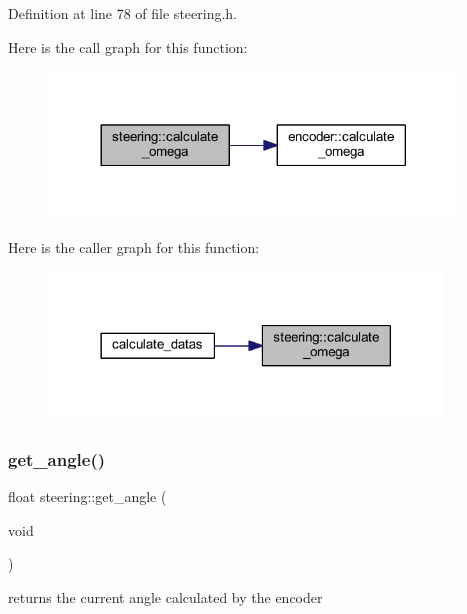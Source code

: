Definition at line 78 of file steering.\+h.

Here is the call graph for this function\+:
\nopagebreak
\begin{figure}[H]
\begin{center}
\leavevmode
\includegraphics[width=308pt]{classsteering_ae5a6bb4e5cb24e22d75723d0f8f10295_cgraph}
\end{center}
\end{figure}
Here is the caller graph for this function\+:
\nopagebreak
\begin{figure}[H]
\begin{center}
\leavevmode
\includegraphics[width=297pt]{classsteering_ae5a6bb4e5cb24e22d75723d0f8f10295_icgraph}
\end{center}
\end{figure}
\mbox{\label{classsteering_aa2e30069b2a7d5ec7c4d8eeb0e30da32}} 
\subsubsection{\texorpdfstring{get\_angle()}{get\_angle()}}
{\footnotesize\ttfamily float steering\+::get\+\_\+angle (\begin{DoxyParamCaption}\item[{void}]{ }\end{DoxyParamCaption})\hspace{0.3cm}{\ttfamily [inline]}}



returns the current angle calculated by the encoder 



